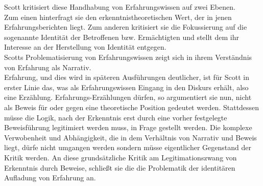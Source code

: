\noindent Scott kritisiert diese Handhabung von Erfahrungswissen auf zwei Ebenen.\\
 Zum
einen hinterfragt sie den erkenntnistheoretischen Wert, der in jenen
Erfahrungsberichten liegt. Zum anderen kritisiert sie die Fokussierung auf die
sogenannte Identität der Betroffenen bzw. Ermächtigten und stellt dem ihr
Interesse an der Herstellung von Identität entgegen.\\
Scotts Problematisierung
von Erfahrungswissen zeigt sich in ihrem Verständnis von Erfahrung als
Narrativ.\\
 Erfahrung, und dies wird in späteren Ausführungen deutlicher, ist für
Scott in erster Linie das, was als Erfahrungswissen Eingang in den Diskurs
erhält, also eine Erzählung. Erfahrungs-Erzählungen dürfen, so argumentiert sie
nun, nicht als Beweis für oder gegen eine theoretische Position gedeutet
werden. Stattdessen müsse die Logik, nach der Erkenntnis erst durch eine vorher
festgelegte Beweisführung legitimiert werden muss, in Frage gestellt werden.
Die komplexe Verwobenheit und Abhängigkeit, die in dem Verhältnis von Narrativ
und Beweis liegt, dürfe nicht umgangen werden sondern müsse eigentlicher
Gegenstand der Kritik werden. An diese grundsätzliche Kritik am
Legitimationszwang von Erkenntnis durch Beweise, schließt sie die die
Problematik der identitären Aufladung von Erfahrung an.\\

